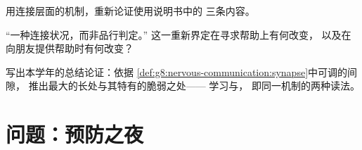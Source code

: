 \begin{exercise}[$\star\star$]\label{exo:g8:protecting-the-nervous-system:10}
用连接层面的机制，重新论证使用说明书中的
三条内容。
\end{exercise}

\begin{exercise}[$\star\star$]\label{exo:g8:protecting-the-nervous-system:11}
“一种连接状况，而非品行判定。”
这一重新界定在寻求帮助上有何改变，
以及在向朋友提供帮助时有何改变？
\end{exercise}

\begin{exercise}[$\star\star\star$]\label{exo:g8:protecting-the-nervous-system:12}
写出本学年的总结论证：依据
\cref{def:g8:nervous-communication:synapse}中可调的间隙，
推出最大的长处与其特有的脆弱之处——
学习与，
即同一机制的两种读法。
\end{exercise}

\section{问题：预防之夜}

